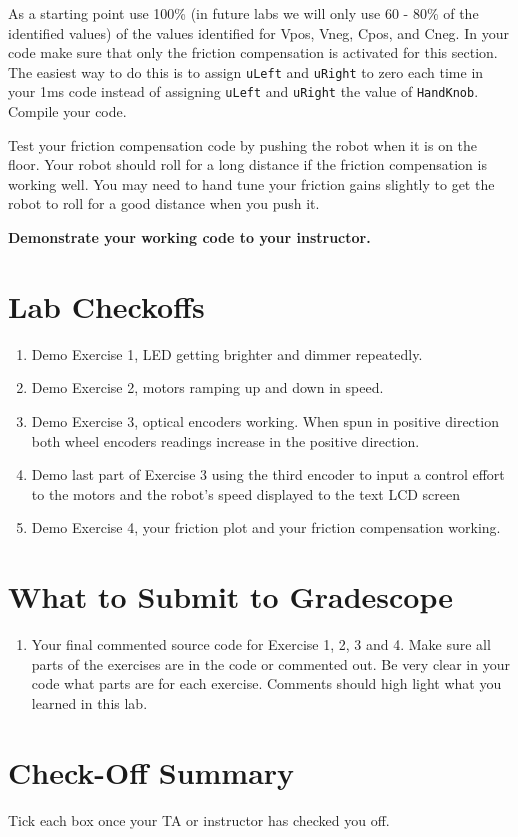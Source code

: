 \documentclass[11pt]{article}
\begin{document}
\begin{enumerate}
        As a starting point use 100\% (in future labs we will only use 60 - 80\% of the identified values) of the values identified for Vpos, Vneg, Cpos, and Cneg. In your code make sure that only the friction compensation is activated for this section. The easiest way to do this is to assign \texttt{uLeft} and \texttt{uRight} to zero each time in your 1ms code instead of assigning \texttt{uLeft} and \texttt{uRight} the value of \texttt{HandKnob}. Compile your code.
\end{enumerate}
%
Test your friction compensation code by pushing the robot when it is on the floor. Your robot should roll for a long distance if the friction compensation is working well. You may need to hand tune your friction gains slightly to get the robot to roll for a good distance when you push it.
%
\begin{checkoff}
        \textbf{Demonstrate your working code to your instructor.}
\end{checkoff}
%
\section*{Lab Checkoffs}
%
\begin{enumerate}
    \item Demo Exercise 1, LED getting brighter and dimmer repeatedly.
    \item Demo Exercise 2, motors ramping up and down in speed.
    \item Demo Exercise 3, optical encoders working. When spun in positive direction both wheel encoders readings increase in the positive direction.
    \item Demo last part of Exercise 3 using the third encoder to input a control effort to the motors and the robot’s speed displayed to the text LCD screen
    \item Demo Exercise 4, your friction plot and your friction compensation working.
\end{enumerate}
%
\section*{What to Submit to Gradescope}
%
\begin{enumerate}
    \item Your final commented source code for Exercise 1, 2, 3 and 4. Make sure all parts of the exercises are in the code or commented out. Be very clear in your code what parts are for each exercise. Comments should high light what you learned in this lab.
\end{enumerate}
%
\section*{Check-Off Summary}

Tick each box once your TA or instructor has checked you off.
%
\CheckOffSummary

\MakeFooter
\end{document}
